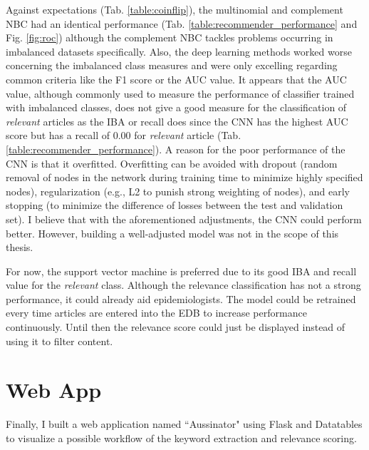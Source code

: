   Against expectations (Tab. \ref{table:coinflip}), the multinomial and complement NBC had an identical performance (Tab. \ref{table:recommender_performance} and Fig. \ref{fig:roc}) although the complement NBC tackles problems occurring in imbalanced datasets specifically.
  Also, the deep learning methods worked worse concerning the imbalanced class measures and were only excelling regarding common criteria like the F1 score or the AUC value.
  It appears that the AUC value, although commonly used to measure the performance of classifier trained with imbalanced classes, does not give a good measure for the classification of \textsl{relevant} articles as the IBA or recall does since the CNN has the highest AUC score but has a recall of 0.00 for \textsl{relevant} article (Tab. \ref{table:recommender_performance}).
  A reason for the poor performance of the CNN is that it overfitted.
  Overfitting can be avoided with dropout (random removal of nodes in the network during training time to minimize highly specified nodes), regularization (e.g., L2 to punish strong weighting of nodes), and early stopping (to minimize the difference of losses between the test and validation set).
  I believe that with the aforementioned adjustments, the CNN could perform better.
  However, building a well-adjusted model was not in the scope of this thesis.

  For now, the support vector machine is preferred due to its good IBA and recall value for the \textsl{relevant} class.
  Although the relevance classification has not a strong performance, it could already aid epidemiologists.
  The model could be retrained every time articles are entered into the EDB to increase performance continuously. Until then the relevance score could just be displayed instead of using it to filter content.

\section{Web App}
  Finally, I built a web application named ``Aussinator" using Flask and Datatables to visualize a possible workflow of the keyword extraction and relevance scoring.

